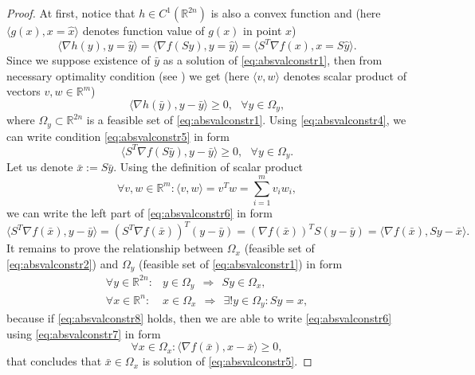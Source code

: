 \begin{proof}
At first, notice that $h \in C^1(\mathbb{R}^{2n})$ is also a convex function and (here $\langle g(x),x=\hat{x} \rangle$ denotes function value of $g(x)$ in point $\hat{x}$)
\begin{equation}
  \label{eq:absvalconstr4}
  \langle \nabla h(y), y = \hat{y} \rangle = 
  \langle \nabla f(Sy), y = \hat{y} \rangle = 
  \langle S^T \nabla f(x), x = S \hat{y} \rangle.
\end{equation}
Since we suppose existence of $\bar{y}$ as a solution of \eqref{eq:absvalconstr1}, then from necessary optimality condition (see )
we get (here $\langle v,w \rangle$ denotes scalar product of vectors $v,w \in \mathbb{R}^m$)
\begin{equation}
 \label{eq:absvalconstr5}
  \langle \nabla h(\bar{y}), y - \bar{y} \rangle \geq 0, ~~~ \forall y \in \Omega_y,
\end{equation}
where $\Omega_y \subset \mathbb{R}^{2n}$ is a feasible set of \eqref{eq:absvalconstr1}. Using \eqref{eq:absvalconstr4}, we can write condition \eqref{eq:absvalconstr5}
in form
\begin{equation}
 \label{eq:absvalconstr6}
  \langle S^T \nabla f(S \bar{y}), y - \bar{y} \rangle \geq 0, ~~~ \forall y \in \Omega_y.
\end{equation}
Let us denote $\bar{x} := S \bar{y}$. Using the definition of scalar product
\begin{displaymath}
 \forall v,w \in \mathbb{R}^m: \langle v,w \rangle = v^T w = \sum\limits_{i = 1}^{m} v_i w_i,
\end{displaymath}
we can write the left part of \eqref{eq:absvalconstr6} in form
\begin{equation}
 \label{eq:absvalconstr7}
 \langle S^T \nabla f(\bar{x}), y - \bar{y} \rangle
 = \left( S^T \nabla f(\bar{x}) \right)^T \left( y - \bar{y} \right)
 = \left( \nabla f(\bar{x}) \right)^T S \left( y - \bar{y} \right)
 = \langle \nabla f(\bar{x}), Sy - \bar{x} \rangle.
\end{equation}
It remains to prove the relationship between $\Omega_x$ (feasible set of \eqref{eq:absvalconstr2}) and $\Omega_y$ (feasible set of \eqref{eq:absvalconstr1}) in form
\begin{equation}
 \label{eq:absvalconstr8}
 \begin{array}{ll}
  \forall y \in \mathbb{R}^{2n}: & y \in \Omega_y ~~ \Rightarrow ~~ Sy \in \Omega_x, \\
  \forall x \in \mathbb{R}^{n}: & x \in \Omega_x ~~ \Rightarrow ~~ \exists ! y \in \Omega_y: Sy = x, 
 \end{array}
\end{equation}
because if \eqref{eq:absvalconstr8} holds, then we are able to write \eqref{eq:absvalconstr6} using \eqref{eq:absvalconstr7} in form
\begin{displaymath}
 \forall x \in \Omega_x: \langle \nabla f(\bar{x}), x - \bar{x} \rangle \geq 0,
\end{displaymath}
that concludes that $\bar{x} \in \Omega_x$ is solution of \eqref{eq:absvalconstr5}.\newline


\end{proof}
